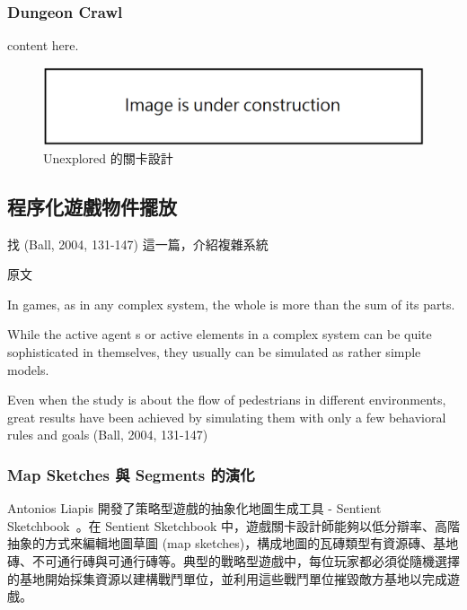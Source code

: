 \subsubsection{Dungeon Crawl}
\label{sssec:relatedworks-proceduralmission-dungeoncrawl}

content here.

\begin{figure}[!htb]
  \begin{center}
    \includegraphics[width=1.0\textwidth]{figures/under_construction.png}
    \caption{Unexplored 的關卡設計} 
    \label{fig:unexplored}
  \end{center}
\end{figure}

\subsection{程序化遊戲物件擺放}
\label{ssec:relatedworks-proceduralgamepatterns}

找  (Ball, 2004, 131-147) 這一篇，介紹複雜系統

原文

In games, as in any complex system, the whole is more than the sum of its parts.  

While the active agent s or active elements in a complex system can be quite sophisticated in themselves, they usually can be simulated as rather simple models. 

Even when the study is about the flow of pedestrians in different environments, great results have been achieved by simulating them with only a few behavioral rules and goals (Ball, 2004, 131-147)


\subsubsection{Map Sketches 與 Segments 的演化}
\label{sssec:relatedworks-proceduralgamepatterns-mapsketches}

Antonios Liapis 開發了策略型遊戲的抽象化地圖生成工具 - Sentient Sketchbook~\cite{liapis2013generating}。在 Sentient Sketchbook 中，遊戲關卡設計師能夠以低分辯率、高階抽象的方式來編輯地圖草圖 (map sketches)，構成地圖的瓦磚類型有資源磚、基地磚、不可通行磚與可通行磚等。典型的戰略型遊戲中，每位玩家都必須從隨機選擇的基地開始採集資源以建構戰鬥單位，並利用這些戰鬥單位摧毀敵方基地以完成遊戲。

